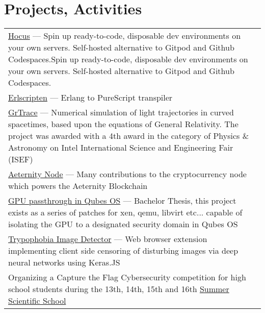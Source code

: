 
\section{\sc Projects, Activities}
\begin{tabular}{@{\llap{\textbullet{ }}~}p{5.15in}}
     \href{https://github.com/hocus-dev/hocus}{Hocus} --- Spin up ready-to-code, disposable dev environments on your own servers. Self-hosted alternative to Gitpod and Github Codespaces.Spin up ready-to-code, disposable dev environments on your own servers. Self-hosted alternative to Gitpod and Github Codespaces. \\

     \href{https://github.com/erlscripten/erlscripten}{Erlscripten} ---  Erlang to PureScript transpiler \\

     \href{https://github.com/grtrace/grtrace}{GrTrace} ---  Numerical simulation of light trajectories in curved spacetimes, based upon the equations of General Relativity. The project was awarded with a 4th award in the category of Physics \& Astronomy on Intel International Science and Engineering Fair (ISEF) \\

     \href{https://github.com/aeternity/aeternity}{Aeternity Node} --- Many contributions to the cryptocurrency node which powers the Aeternity Blockchain \\

     \href{www.qubes-os.org}{GPU passthrough in Qubes OS}  --- Bachelor Thesis, this project exists as a series of patches for xen, qemu, libvirt etc... capable of isolating the GPU to a designated security domain in Qubes OS \\

     \href{https://github.com/cytadela8/trypophobia}{Trypophobia Image Detector} --- Web browser extension implementing client side censoring of disturbing images via deep neural networks using Keras.JS \\
          
     Organizing a Capture the Flag Cybersecurity competition for high school students during the 13th, 14th, 15th and 16th \href{https://warsztatywww.pl/article/en-indie-camp-for-hs-geeks/}{Summer Scientific School}
     
\end{tabular}
\vspace{-0.3in}
